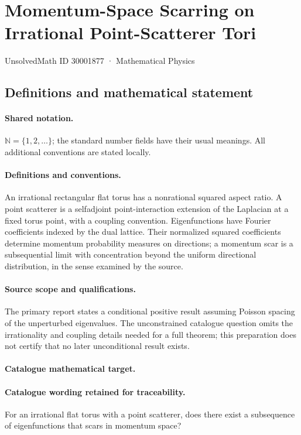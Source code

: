 \documentclass[11pt]{article}
\begin{document}
\setcounter{section}{30001876}
\section{Momentum-Space Scarring on Irrational Point-Scatterer Tori}\label{30001877}
{\small UnsolvedMath ID 30001877 · Mathematical Physics}
\subsection{Definitions and mathematical statement}

\paragraph{Shared notation.}$\mathbb N=\{1,2,\ldots\}$; the standard number fields have their usual meanings. All additional conventions are stated locally.


\paragraph{Definitions and conventions.} An irrational rectangular flat torus has a nonrational squared aspect ratio. A point scatterer is a selfadjoint point-interaction extension of the Laplacian at a fixed torus point, with a coupling convention. Eigenfunctions have Fourier coefficients indexed by the dual lattice. Their normalized squared coefficients determine momentum probability measures on directions; a momentum scar is a subsequential limit with concentration beyond the uniform directional distribution, in the sense examined by the source.

\paragraph{Source scope and qualifications.} The primary report states a conditional positive result assuming Poisson spacing of the unperturbed eigenvalues. The unconstrained catalogue question omits the irrationality and coupling details needed for a full theorem; this preparation does not certify that no later unconditional result exists.

\paragraph{Catalogue mathematical target.}
\paragraph{Catalogue wording retained for traceability.}
For an irrational flat torus with a point scatterer, does there exist a subsequence of eigenfunctions that scars in momentum space?
\end{document}
